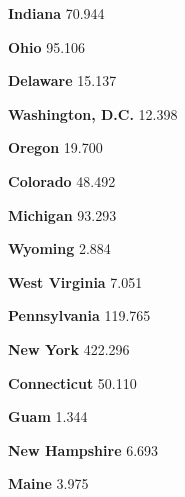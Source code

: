 \textbf{Indiana} 70.944

\href{https://www.nytimes.com/interactive/2020/us/ohio-coronavirus-cases.html}{}

\textbf{Ohio} 95.106

\href{https://www.nytimes.com/interactive/2020/us/delaware-coronavirus-cases.html}{}

\textbf{Delaware} 15.137

\href{https://www.nytimes.com/interactive/2020/us/washington-dc-coronavirus-cases.html}{}

\textbf{Washington, D.C.} 12.398

\href{https://www.nytimes.com/interactive/2020/us/oregon-coronavirus-cases.html}{}

\textbf{Oregon} 19.700

\href{https://www.nytimes.com/interactive/2020/us/colorado-coronavirus-cases.html}{}

\textbf{Colorado} 48.492

\href{https://www.nytimes.com/interactive/2020/us/michigan-coronavirus-cases.html}{}

\textbf{Michigan} 93.293

\href{https://www.nytimes.com/interactive/2020/us/wyoming-coronavirus-cases.html}{}

\textbf{Wyoming} 2.884

\href{https://www.nytimes.com/interactive/2020/us/west-virginia-coronavirus-cases.html}{}

\textbf{West Virginia} 7.051

\href{https://www.nytimes.com/interactive/2020/us/pennsylvania-coronavirus-cases.html}{}

\textbf{Pennsylvania} 119.765

\href{https://www.nytimes.com/interactive/2020/us/new-york-coronavirus-cases.html}{}

\textbf{New York} 422.296

\href{https://www.nytimes.com/interactive/2020/us/connecticut-coronavirus-cases.html}{}

\textbf{Connecticut} 50.110

\textbf{Guam} 1.344

\href{https://www.nytimes.com/interactive/2020/us/new-hampshire-coronavirus-cases.html}{}

\textbf{New Hampshire} 6.693

\href{https://www.nytimes.com/interactive/2020/us/maine-coronavirus-cases.html}{}

\textbf{Maine} 3.975

